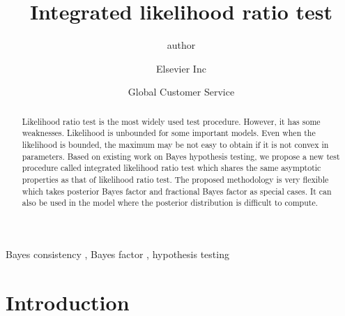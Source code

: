 \documentclass[3p]{elsarticle}
\theoremstyle{plain}
\theoremstyle{definition}
\theoremstyle{remark}
\begin{document}
\begin{frontmatter}

\title{Integrated likelihood ratio test}

\author{author }
\address{Radarweg 29, Amsterdam}

\author[mymainaddress,mysecondaryaddress]{Elsevier Inc}

\author[mysecondaryaddress]{Global Customer Service}

\address[mymainaddress]{1600 John F Kennedy Boulevard, Philadelphia}
\address[mysecondaryaddress]{360 Park Avenue South, New York}

\begin{abstract}

    Likelihood ratio test is the most widely used test procedure.
    However, it has some weaknesses.
    Likelihood is unbounded for some important models.
    Even when the likelihood is bounded, the maximum may be not easy to obtain if it is not convex in parameters.
    Based on existing work on Bayes hypothesis testing,
    we propose a new test procedure called integrated likelihood ratio test which shares the same asymptotic properties as that of likelihood ratio test.
    The proposed methodology is very flexible which takes posterior Bayes factor and fractional Bayes factor as special cases.
    It can also be used in the model where the posterior distribution is difficult to compute.
\end{abstract}

\begin{keyword}
    Bayes consistency \sep
   Bayes factor \sep
 hypothesis testing 
    
\end{keyword}

\end{frontmatter}


\section{Introduction}
\end{document}
